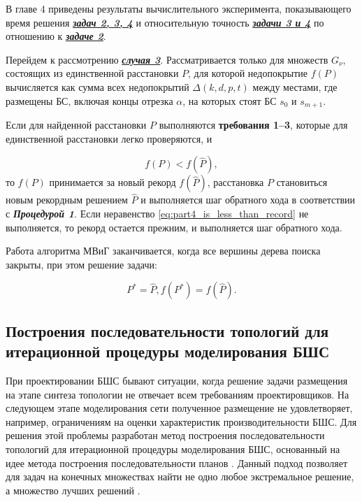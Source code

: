 В главе 4 приведены результаты вычислительного эксперимента, показывающего время решения \underline{\textit{\textbf{задач 2, 3, 4}}} и относительную точность \underline{\textit{\textbf{задачи 3 и 4}}} по отношению к \underline{\textit{\textbf{задаче 2}}}.

Перейдем к рассмотрению \underline{\textit{\textbf{случая 3}}}. Рассматривается только для множеств $G_\nu$, состоящих из единственной расстановки $P$, для которой недопокрытие $f(P)$ вычисляется как сумма всех недопокрытий $\Delta(k,d,p,t)$ между местами, где размещены БС, включая концы отрезка $\alpha$, на которых стоят БС $s_0$ и $s_{m+1}$. 

Если для найденной расстановки $P$ выполняются \textbf{требования 1--3}, которые для единственной расстановки легко проверяются, и

\begin{equation}
    \label{eq:part4_is_less_than_record}
    f(P) < f(\widehat{P}),
\end{equation}
то $f(P)$ принимается за новый рекорд $f(\widehat{P})$, расстановка $P$ становиться новым рекордным решением $\widehat{P}$ и выполняется шаг обратного хода в соответствии с \textit{\textbf{Процедурой 1}}. Если неравенство \cref{eq:part4_is_less_than_record} не выполняется, то рекорд остается прежним, и выполняется шаг обратного хода.

Работа алгоритма МВиГ заканчивается, когда все вершины дерева поиска закрыты, при этом решение задачи: 

\begin{displaymath}
    P^{*} = \widehat{P},  f(P^*) = f(\widehat{P}).
\end{displaymath}

\subsection{Построения последовательности топологий для итерационной процедуры моделирования БШС}

При проектировании БШС бывают ситуации, когда решение задачи размещения на этапе синтеза топологии не отвечает всем требованиям проектировщиков. На следующем этапе моделирования сети полученное размещение не удовлетворяет, например, ограничениям на оценки характеристик производительности БШС. Для решения этой проблемы разработан метод построения последовательности топологий для итерационной процедуры моделирования БШС, основанный на идее метода построения последовательности планов \cite{Emelichev}. Данный подход позволяет для задач на конечных множествах найти не одно любое экстремальное решение, а множество лучших решений \cite{Pershin1999, Pershin2002}.

